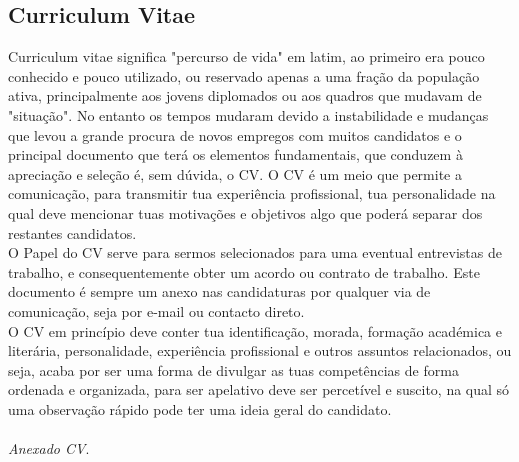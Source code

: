 \subsection{Curriculum Vitae}
\qquad Curriculum vitae significa "percurso de vida" \; em latim, ao primeiro era pouco conhecido e pouco utilizado, ou reservado apenas a uma fração da população ativa, principalmente aos jovens diplomados ou aos quadros que mudavam de "situação". No entanto os tempos mudaram devido a instabilidade e mudanças que levou a grande procura de novos empregos com muitos candidatos e o principal documento que terá os elementos fundamentais, que conduzem à apreciação e seleção é, sem dúvida, o CV.\cite{book-12}
O CV é um meio que permite a comunicação, para transmitir tua experiência profissional, tua personalidade na qual deve mencionar tuas motivações e objetivos algo que poderá separar dos restantes candidatos. \\
O Papel do CV serve para sermos selecionados para uma eventual entrevistas de trabalho, e consequentemente obter um acordo ou contrato de trabalho. Este documento é sempre um anexo nas candidaturas por qualquer via de comunicação, seja por e-mail ou contacto direto. \\
O CV em princípio deve conter tua identificação, morada, formação académica e literária, personalidade, experiência profissional e outros assuntos relacionados, ou seja, acaba por ser uma forma de divulgar as tuas competências de forma ordenada e organizada, para ser apelativo deve ser percetível e suscito, na qual só uma observação rápido pode ter uma ideia geral do candidato. \\
\\
\textit{Anexado CV}. \\
